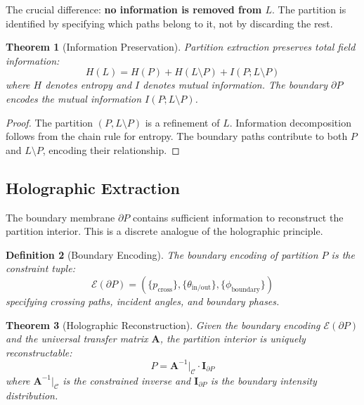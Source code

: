 \documentclass[twocolumn,10pt,a4paper]{article}
\newtheorem{theorem}{Theorem}[section]
\newtheorem{definition}[theorem]{Definition}
\begin{document}
The crucial difference: \textbf{no information is removed from $L$}. The partition is identified by specifying which paths belong to it, not by discarding the rest.

\begin{theorem}[Information Preservation]
Partition extraction preserves total field information:
\begin{equation}
H(L) = H(P) + H(L \setminus P) + I(P; L \setminus P)
\end{equation}
where $H$ denotes entropy and $I$ denotes mutual information. The boundary $\partial P$ encodes the mutual information $I(P; L \setminus P)$.
\end{theorem}

\begin{proof}
The partition $(P, L \setminus P)$ is a refinement of $L$. Information decomposition follows from the chain rule for entropy. The boundary paths contribute to both $P$ and $L \setminus P$, encoding their relationship.
\end{proof}

\subsection{Holographic Extraction}

The boundary membrane $\partial P$ contains sufficient information to reconstruct the partition interior. This is a discrete analogue of the holographic principle.

\begin{definition}[Boundary Encoding]
The boundary encoding of partition $P$ is the constraint tuple:
\begin{equation}
\mathcal{E}(\partial P) = \left( \{p_{\text{cross}}\}, \{\theta_{\text{in/out}}\}, \{\phi_{\text{boundary}}\} \right)
\end{equation}
specifying crossing paths, incident angles, and boundary phases.
\end{definition}

\begin{theorem}[Holographic Reconstruction]
Given the boundary encoding $\mathcal{E}(\partial P)$ and the universal transfer matrix $\mathbf{A}$, the partition interior is uniquely reconstructable:
\begin{equation}
P = \mathbf{A}^{-1}|_{\mathcal{C}} \cdot \mathbf{I}_{\partial P}
\end{equation}
where $\mathbf{A}^{-1}|_{\mathcal{C}}$ is the constrained inverse and $\mathbf{I}_{\partial P}$ is the boundary intensity distribution.
\end{theorem}
\end{document}
